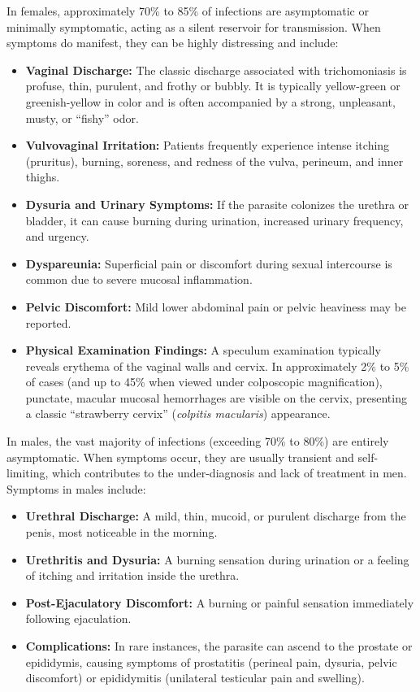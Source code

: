 In females, approximately 70\% to 85\% of infections are asymptomatic or minimally symptomatic, acting as a silent reservoir for transmission. When symptoms do manifest, they can be highly distressing and include:
\begin{itemize}
    \item \textbf{Vaginal Discharge:} The classic discharge associated with trichomoniasis is profuse, thin, purulent, and frothy or bubbly. It is typically yellow-green or greenish-yellow in color and is often accompanied by a strong, unpleasant, musty, or ``fishy'' odor.
    \item \textbf{Vulvovaginal Irritation:} Patients frequently experience intense itching (pruritus), burning, soreness, and redness of the vulva, perineum, and inner thighs.
    \item \textbf{Dysuria and Urinary Symptoms:} If the parasite colonizes the urethra or bladder, it can cause burning during urination, increased urinary frequency, and urgency.
    \item \textbf{Dyspareunia:} Superficial pain or discomfort during sexual intercourse is common due to severe mucosal inflammation.
    \item \textbf{Pelvic Discomfort:} Mild lower abdominal pain or pelvic heaviness may be reported.
    \item \textbf{Physical Examination Findings:} A speculum examination typically reveals erythema of the vaginal walls and cervix. In approximately 2\% to 5\% of cases (and up to 45\% when viewed under colposcopic magnification), punctate, macular mucosal hemorrhages are visible on the cervix, presenting a classic ``strawberry cervix'' (\textit{colpitis macularis}) appearance.
\end{itemize}

In males, the vast majority of infections (exceeding 70\% to 80\%) are entirely asymptomatic. When symptoms occur, they are usually transient and self-limiting, which contributes to the under-diagnosis and lack of treatment in men. Symptoms in males include:
\begin{itemize}
    \item \textbf{Urethral Discharge:} A mild, thin, mucoid, or purulent discharge from the penis, most noticeable in the morning.
    \item \textbf{Urethritis and Dysuria:} A burning sensation during urination or a feeling of itching and irritation inside the urethra.
    \item \textbf{Post-Ejaculatory Discomfort:} A burning or painful sensation immediately following ejaculation.
    \item \textbf{Complications:} In rare instances, the parasite can ascend to the prostate or epididymis, causing symptoms of prostatitis (perineal pain, dysuria, pelvic discomfort) or epididymitis (unilateral testicular pain and swelling).
\end{itemize}

